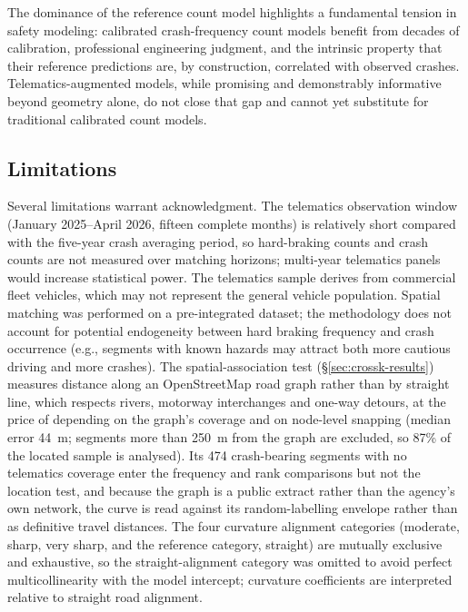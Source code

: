 \documentclass[letterpaper,8pt]{extarticle}  %
\begin{document}
\begin{doublespacing}
\begin{linenumbers}
The dominance of the reference count model highlights a fundamental tension in safety modeling: calibrated crash-frequency count models benefit from decades of calibration, professional engineering judgment, and the intrinsic property that their reference predictions are, by construction, correlated with observed crashes. Telematics-augmented models, while promising and demonstrably informative beyond geometry alone, do not close that gap and cannot yet substitute for traditional calibrated count models.

\subsection{Limitations}\label{sec:limitations}

Several limitations warrant acknowledgment. The telematics observation window (January 2025--April 2026, fifteen complete months) is relatively short compared with the five-year crash averaging period, so hard-braking counts and crash counts are not measured over matching horizons; multi-year telematics panels would increase statistical power. The telematics sample derives from commercial fleet vehicles, which may not represent the general vehicle population. Spatial matching was performed on a pre-integrated dataset; the methodology does not account for potential endogeneity between hard braking frequency and crash occurrence (e.g., segments with known hazards may attract both more cautious driving and more crashes). The spatial-association test (\S\ref{sec:crossk-results}) measures distance along an OpenStreetMap road graph rather than by straight line, which respects rivers, motorway interchanges and one-way detours, at the price of depending on the graph's coverage and on node-level snapping (median error 44~m; segments more than 250~m from the graph are excluded, so 87\% of the located sample is analysed). Its 474 crash-bearing segments with no telematics coverage enter the frequency and rank comparisons but not the location test, and because the graph is a public extract rather than the agency's own network, the curve is read against its random-labelling envelope rather than as definitive travel distances. The four curvature alignment categories (moderate, sharp, very sharp, and the reference category, straight) are mutually exclusive and exhaustive, so the straight-alignment category was omitted to avoid perfect multicollinearity with the model intercept; curvature coefficients are interpreted relative to straight road alignment.


\end{linenumbers}
\end{doublespacing}
\end{document}
